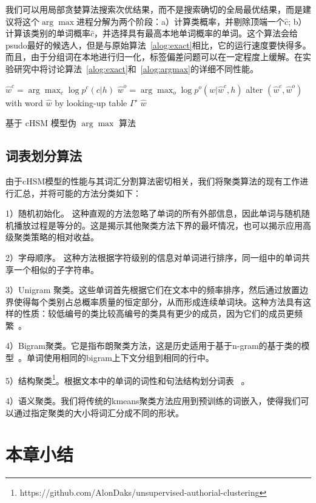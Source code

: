 我们可以用局部贪婪算法搜索次优结果，而不是搜索确切的全局最优结果，而是建议将这个$ \arg\max $进程分解为两个阶段：a）计算类概率，并剔除顶端一个$ \hat c $; b）计算该类别的单词概率$ \hat c $，并选择具有最高本地单词概率的单词。这个算法会给psudo最好的候选人，但是与原始算法~\ref{alog:exact}相比，它的运行速度要快得多。而且，由于分组词在本地进行归一化，标签偏差问题可以在一定程度上缓解。在实验研究中将讨论算法~\ref{alog:exact}和~\ref{alog:argmax}的详细不同性能。
\begin{algorithm}[!ht]
 $\hat w^c=\arg\max_c{\log p^c(c|h)}$ 
 $\hat w^o=\arg\max_o{\log p^o(w|\hat w^c,h)}$
 alter $(\hat w^c,\hat w^o)$ with word $\hat w$ by looking-up table $\Gamma'$ \;
 \Return $\hat w$
 \caption{基于 cHSM 模型伪 $\arg\max$ 算法}\label{alog:argmax}
\end{algorithm}

\subsection{词表划分算法}
由于cHSM模型的性能与其词汇分割算法密切相关，我们将聚类算法的现有工作进行汇总，并将可能的方法分类如下：

1）随机初始化。 这种直观的方法忽略了单词的所有外部信息，因此单词与随机随机播放过程是等分的。这是揭示其他聚类方法下界的最坏情况，也可以揭示应用高级聚类策略的相对收益。

2）字母顺序。 这种方法根据字符级别的信息对单词进行排序，同一组中的单词共享一个相似的子字符串。

3）Unigram 聚类。这些单词首先根据它们在文本中的频率排序，然后通过放置边界使得每个类别占总概率质量的恒定部分，从而形成连续单词块。这种方法具有这样的性质：较低编号的类比较高编号的类具有更少的成员，因为它们的成员更频繁~。

4）Bigram聚类。它是指布朗聚类方法，这是历史适用于基于n-gram的基于类的模型~。单词使用相同的bigram上下文分组到相同的行中。

5）结构聚类\footnote{https://github.com/AlonDaks/unsupervised-authorial-clustering}。根据文本中的单词的词性和句法结构划分词表~ 。

4）语义聚类。我们将传统的kmeans聚类方法应用到预训练的词嵌入，使得我们可以通过指定聚类的大小将词汇分成不同的形状。
\section{本章小结}